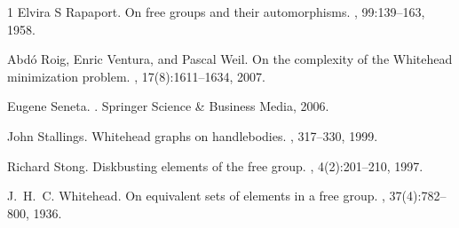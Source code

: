 \documentclass{article}
\begin{document}
\begin{thebibliography}{1}
Elvira S Rapaport. 
\newblock On free groups and their automorphisms.
, 99:139--163, 1958.

Abd\'{o} Roig, Enric Ventura, and Pascal Weil.
\newblock On the complexity of the Whitehead minimization problem.
, 17(8):1611--1634, 2007.

Eugene Seneta.
.
\newblock Springer Science \& Business Media, 2006.

John Stallings.
\newblock Whitehead graphs on handlebodies.
, 317--330, 1999.

Richard Stong.
\newblock Diskbusting elements of the free group.
, 4(2):201--210, 1997.

J.~H.~C. Whitehead.
\newblock On equivalent sets of elements in a free group.
, 37(4):782--800, 1936.

\end{thebibliography}
\end{document}
